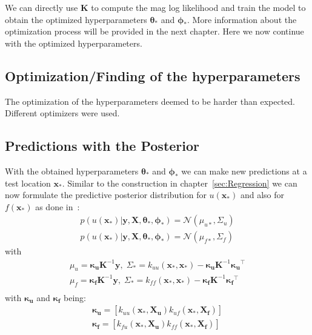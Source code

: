 \documentclass{article}
\begin{document}
We can directly use $\bm{K}$ to compute the mag log likelihood and train the model to obtain the optimized hyperparameters $\bm{\theta_*}$ and $\bm{\phi_*}$. More information about the optimization process will be provided in the next chapter. Here we now continue with the optimized hyperparameters.
\subsection{Optimization/Finding of the hyperparameters}


The optimization of the hyperparameters deemed to be harder than expected. Different optimizers were used. 
\subsection{Predictions with the Posterior}
With the obtained hyperparameters $\bm{\theta_*}$ and $\bm{\phi_*}$ we can make new predictions at a test location $\bm{x_*}$. Similar to the construction in chapter~\ref{sec:Regression} we can now formulate the predictive posterior distribution for $u(\bm{x_*})$ and also for $f(\bm{x_*})$ as done in~\cite{RAISSI}:
\begin{equation}
    \begin{aligned}
        p(u(\bm{x_*})|\bm{y},\bm{X},\bm{\theta_*}, \bm{\phi_*}) = \mathcal{N}(\mu_{u*}, \Sigma_u)\\
        p(u(\bm{x_*})|\bm{y},\bm{X},\bm{\theta_*}, \bm{\phi_*}) = \mathcal{N}(\mu_{f*}, \Sigma_f)
    \end{aligned}
\end{equation}
with
\begin{equation}
    \begin{aligned}
        \mu_u = \bm{\kappa_u}\bm{K}^{-1}\bm{y}, \; \Sigma_* = k_{uu}(\bm{x_*,x_*}) - \bm{\kappa_u}\bm{K}^{-1}\bm{\kappa_u}^\intercal\\
        \mu_f = \bm{\kappa_f}\bm{K}^{-1}\bm{y}, \;  \Sigma_* = k_{ff}(\bm{x_*,x_*}) - \bm{\kappa_f}\bm{K}^{-1}\bm{\kappa_f}^\intercal\\  
    \end{aligned}
\end{equation}
with $\bm{\kappa_u}$ and $\bm{\kappa_f}$ being:
\begin{equation}
    \begin{aligned}
        \bm{\kappa_u} = [k_{uu}(\bm{x_*},\bm{X_u})k_{uf}(\bm{x_*,\bm{X_f}})]\\
        \bm{\kappa_f} = [k_{fu}(\bm{x_*},\bm{X_u})k_{ff}(\bm{x_*,\bm{X_f}})]
    \end{aligned}
\end{equation}
\end{document}
